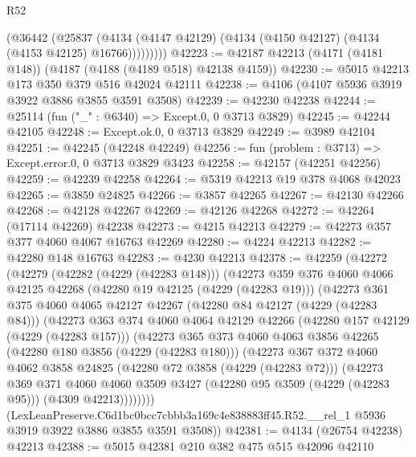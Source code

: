 \begin{lexlean}{R52}
\begin{coremodule}
            (@36442
              (@25837
                (@4134 (@4147 @42129) (@4134 (@4150 @42127) (@4134 (@4153 @42125) @16766)))))))))
@42223 := @42187 @42213 (@4171 (@4181 @148)) (@4187 (@4188 (@4189 @518) @42138 @4159))
@42230 := @5015 @42213 @173 @350 @379 @516 @42024 @42111
@42238 := @4106 (@4107 @5936 @3919 @3922 @3886 @3855 @3591 @3508)
@42239 := @42230 @42238
@42244 := @25114 (fun ("_" : @6340) => Except.{0, 0} @3713 @3829)
@42245 := @42244 @42105
@42248 := Except.ok.{0, 0} @3713 @3829
@42249 := @3989 @42104
@42251 := @42245 (@42248 @42249)
@42256 := fun (problem : @3713) => Except.error.{0, 0} @3713 @3829 @3423
@42258 := @42157 (@42251 @42256)
@42259 := @42239 @42258
@42264 := @5319 @42213 @19 @378 @4068 @42023
@42265 := @3859 @24825
@42266 := @3857 @42265
@42267 := @42130 @42266
@42268 := @42128 @42267
@42269 := @42126 @42268
@42272 := @42264 (@17114 @42269) @42238
@42273 := @4215 @42213
@42279 := @42273 @357 @377 @4060 @4067 @16763 @42269
@42280 := @4224 @42213
@42282 := @42280 @148 @16763
@42283 := @4230 @42213
@42378 := @42259
    (@42272
      (@42279
        (@42282 (@4229 (@42283 @148)))
        (@42273
          @359
          @376
          @4060
          @4066
          @42125
          @42268
          (@42280 @19 @42125 (@4229 (@42283 @19)))
          (@42273
            @361
            @375
            @4060
            @4065
            @42127
            @42267
            (@42280 @84 @42127 (@4229 (@42283 @84)))
            (@42273
              @363
              @374
              @4060
              @4064
              @42129
              @42266
              (@42280 @157 @42129 (@4229 (@42283 @157)))
              (@42273
                @365
                @373
                @4060
                @4063
                @3856
                @42265
                (@42280 @180 @3856 (@4229 (@42283 @180)))
                (@42273
                  @367
                  @372
                  @4060
                  @4062
                  @3858
                  @24825
                  (@42280 @72 @3858 (@4229 (@42283 @72)))
                  (@42273
                    @369
                    @371
                    @4060
                    @4060
                    @3509
                    @3427
                    (@42280 @95 @3509 (@4229 (@42283 @95)))
                    (@4309 @42213))))))))
      (LexLeanPreserve.C6d1bc0bcc7cbbb3a169c4e838883ff45.R52.__rel_1
        @5936
        @3919
        @3922
        @3886
        @3855
        @3591
        @3508))
@42381 := @4134 (@26754 @42238) @42213
@42388 := @5015 @42381 @210 @382 @475 @515 @42096 @42110

\end{coremodule}
\end{lexlean}
